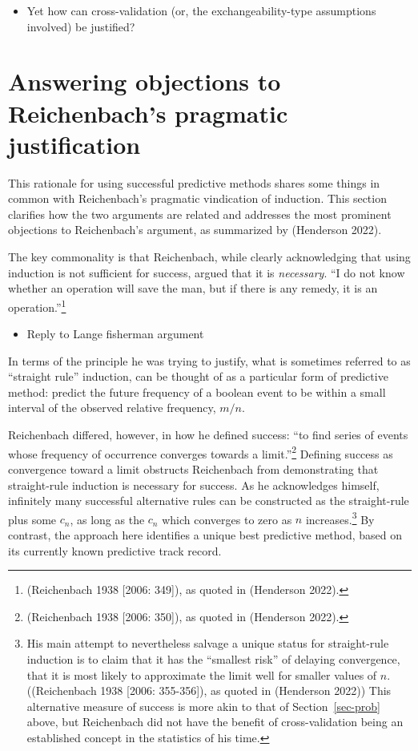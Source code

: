 \documentclass[
  letterpaper,
  DIV=11,
  numbers=noendperiod]{scrartcl}
\providecommand{\tightlist}{%
  \setlength{\itemsep}{0pt}\setlength{\parskip}{0pt}}\usepackage{longtable,booktabs,array}
\theoremstyle{definition}
\theoremstyle{remark}
\begin{document}
\begin{itemize}
\tightlist
\item
  Yet how can cross-validation (or, the exchangeability-type assumptions
  involved) be justified?
\end{itemize}

\section{Answering objections to Reichenbach's pragmatic
justification}\label{sec-induct}

This rationale for using successful predictive methods shares some
things in common with Reichenbach's pragmatic vindication of induction.
This section clarifies how the two arguments are related and addresses
the most prominent objections to Reichenbach's argument, as summarized
by (Henderson 2022).

The key commonality is that Reichenbach, while clearly acknowledging
that using induction is not sufficient for success, argued that it is
\emph{necessary}. ``I do not know whether an operation will save the
man, but if there is any remedy, it is an operation.''\footnote{(Reichenbach
  1938 {[}2006: 349{]}), as quoted in (Henderson 2022).}

\begin{itemize}
\tightlist
\item
  Reply to Lange fisherman argument
\end{itemize}

In terms of the principle he was trying to justify, what is sometimes
referred to as ``straight rule'' induction, can be thought of as a
particular form of predictive method: predict the future frequency of a
boolean event to be within a small interval of the observed relative
frequency, \(m/n\).

Reichenbach differed, however, in how he defined success: ``to find
series of events whose frequency of occurrence converges towards a
limit.''\footnote{(Reichenbach 1938 {[}2006: 350{]}), as quoted in
  (Henderson 2022).} Defining success as convergence toward a limit
obstructs Reichenbach from demonstrating that straight-rule induction is
necessary for success. As he acknowledges himself, infinitely many
successful alternative rules can be constructed as the straight-rule
plus some \(c_n\), as long as the \(c_n\) which converges to zero as
\(n\) increases.\footnote{His main attempt to nevertheless salvage a
  unique status for straight-rule induction is to claim that it has the
  ``smallest risk'' of delaying convergence, that it is most likely to
  approximate the limit well for smaller values of \(n\).((Reichenbach
  1938 {[}2006: 355-356{]}), as quoted in (Henderson 2022)) This
  alternative measure of success is more akin to that of
  Section~\ref{sec-prob} above, but Reichenbach did not have the benefit
  of cross-validation being an established concept in the statistics of
  his time.} By contrast, the approach here identifies a unique best
predictive method, based on its currently known predictive track record.
\end{document}
